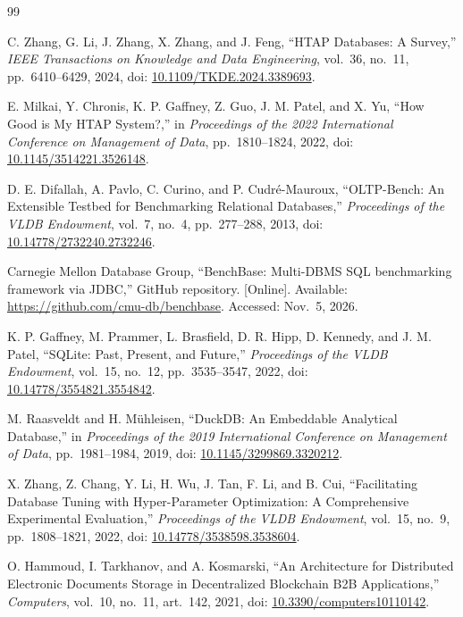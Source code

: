 \documentclass{misisarticle}
\begin{document}
\begin{thebibliography}{99}

 C. Zhang, G. Li, J. Zhang, X. Zhang, and J. Feng, ``HTAP Databases: A Survey,'' \textit{IEEE Transactions on Knowledge and Data Engineering}, vol.~36, no.~11, pp.~6410--6429, 2024, doi: \href{https://doi.org/10.1109/TKDE.2024.3389693}{10.1109/TKDE.2024.3389693}.

 E. Milkai, Y. Chronis, K. P. Gaffney, Z. Guo, J. M. Patel, and X. Yu, ``How Good is My HTAP System?,'' in \textit{Proceedings of the 2022 International Conference on Management of Data}, pp.~1810--1824, 2022, doi: \href{https://doi.org/10.1145/3514221.3526148}{10.1145/3514221.3526148}.

 D. E. Difallah, A. Pavlo, C. Curino, and P. Cudr\'{e}-Mauroux, ``OLTP-Bench: An Extensible Testbed for Benchmarking Relational Databases,'' \textit{Proceedings of the VLDB Endowment}, vol.~7, no.~4, pp.~277--288, 2013, doi: \href{https://doi.org/10.14778/2732240.2732246}{10.14778/2732240.2732246}.

 Carnegie Mellon Database Group, ``BenchBase: Multi-DBMS SQL benchmarking framework via JDBC,'' GitHub repository. [Online]. Available: \url{https://github.com/cmu-db/benchbase}. Accessed: Nov.~5, 2026.

 K. P. Gaffney, M. Prammer, L. Brasfield, D. R. Hipp, D. Kennedy, and J. M. Patel, ``SQLite: Past, Present, and Future,'' \textit{Proceedings of the VLDB Endowment}, vol.~15, no.~12, pp.~3535--3547, 2022, doi: \href{https://doi.org/10.14778/3554821.3554842}{10.14778/3554821.3554842}.

 M. Raasveldt and H. M\"{u}hleisen, ``DuckDB: An Embeddable Analytical Database,'' in \textit{Proceedings of the 2019 International Conference on Management of Data}, pp.~1981--1984, 2019, doi: \href{https://doi.org/10.1145/3299869.3320212}{10.1145/3299869.3320212}.

 X. Zhang, Z. Chang, Y. Li, H. Wu, J. Tan, F. Li, and B. Cui, ``Facilitating Database Tuning with Hyper-Parameter Optimization: A Comprehensive Experimental Evaluation,'' \textit{Proceedings of the VLDB Endowment}, vol.~15, no.~9, pp.~1808--1821, 2022, doi: \href{https://doi.org/10.14778/3538598.3538604}{10.14778/3538598.3538604}.

 O. Hammoud, I. Tarkhanov, and A. Kosmarski, ``An Architecture for Distributed Electronic Documents Storage in Decentralized Blockchain B2B Applications,'' \textit{Computers}, vol.~10, no.~11, art.~142, 2021, doi: \href{https://doi.org/10.3390/computers10110142}{10.3390/computers10110142}.


\end{thebibliography}
\end{document}
